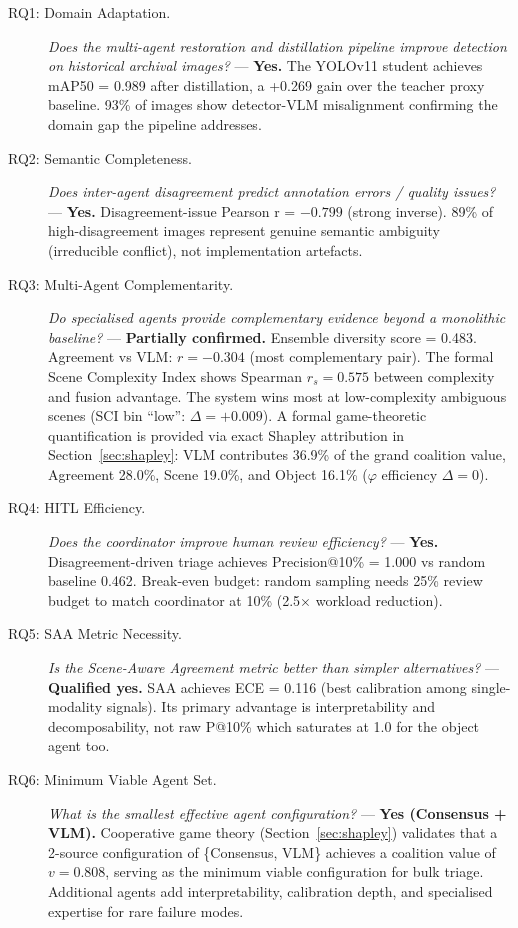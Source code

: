 \documentclass[12pt,onecolumn,a4paper]{IEEEtran}
\begin{document}
\begin{description}
    \item[RQ1: Domain Adaptation.] \textit{Does the multi-agent restoration and distillation pipeline improve detection on historical archival images?} --- \textbf{Yes.} The YOLOv11 student achieves mAP50 = 0.989 after distillation, a +0.269 gain over the teacher proxy baseline. 93\% of images show detector-VLM misalignment confirming the domain gap the pipeline addresses.

    \item[RQ2: Semantic Completeness.] \textit{Does inter-agent disagreement predict annotation errors / quality issues?} --- \textbf{Yes.} Disagreement-issue Pearson r = $-0.799$ (strong inverse). 89\% of high-disagreement images represent genuine semantic ambiguity (irreducible conflict), not implementation artefacts.

    \item[RQ3: Multi-Agent Complementarity.] \textit{Do specialised agents provide complementary evidence beyond a monolithic baseline?} --- \textbf{Partially confirmed.} Ensemble diversity score = 0.483. Agreement vs VLM: $r = -0.304$ (most complementary pair). The formal Scene Complexity Index shows Spearman $r_s = 0.575$ between complexity and fusion advantage. The system wins most at low-complexity ambiguous scenes (SCI bin ``low'': $\Delta = +0.009$). A formal game-theoretic quantification is provided via exact Shapley attribution in Section~\ref{sec:shapley}: VLM contributes 36.9\% of the grand coalition value, Agreement 28.0\%, Scene 19.0\%, and Object 16.1\% ($\varphi$ efficiency $\Delta = 0$).

    \item[RQ4: HITL Efficiency.] \textit{Does the coordinator improve human review efficiency?} --- \textbf{Yes.} Disagreement-driven triage achieves Precision@10\% = 1.000 vs random baseline 0.462. Break-even budget: random sampling needs 25\% review budget to match coordinator at 10\% (2.5$\times$ workload reduction).

    \item[RQ5: SAA Metric Necessity.] \textit{Is the Scene-Aware Agreement metric better than simpler alternatives?} --- \textbf{Qualified yes.} SAA achieves ECE = 0.116 (best calibration among single-modality signals). Its primary advantage is interpretability and decomposability, not raw P@10\% which saturates at 1.0 for the object agent too.

    \item[RQ6: Minimum Viable Agent Set.] \textit{What is the smallest effective agent configuration?} --- \textbf{Yes (Consensus + VLM).} Cooperative game theory (Section~\ref{sec:shapley}) validates that a 2-source configuration of \{Consensus, VLM\} achieves a coalition value of $v = 0.808$, serving as the minimum viable configuration for bulk triage. Additional agents add interpretability, calibration depth, and specialised expertise for rare failure modes.


\end{description}
\end{document}
